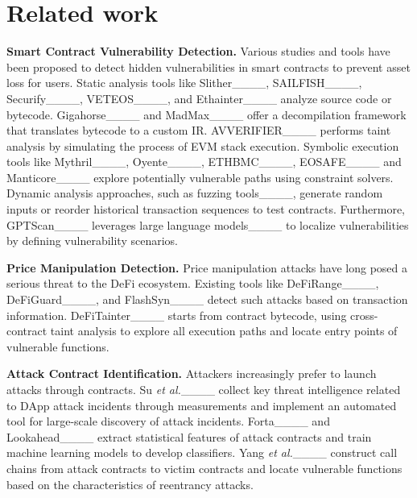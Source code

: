 \section{Related work}
\label{sec:related}


\noindent \textbf{Smart Contract Vulnerability Detection.} Various studies and tools have been proposed to detect hidden vulnerabilities in smart contracts to prevent asset loss for users. Static analysis tools like Slither____, SAILFISH____,  Securify____, VETEOS____, and Ethainter____ analyze source code or bytecode. Gigahorse____  and MadMax____ offer a decompilation framework that translates bytecode to a custom IR. AVVERIFIER____ performs taint analysis by simulating the process of EVM stack execution. Symbolic execution tools like Mythril____, Oyente____, ETHBMC____, EOSAFE____ and Manticore____ explore potentially vulnerable paths using constraint solvers. Dynamic analysis approaches, such as fuzzing tools____, generate random inputs or reorder historical transaction sequences to test contracts. Furthermore, GPTScan____ leverages large language models____ to localize vulnerabilities by defining vulnerability scenarios.


\noindent \textbf{Price Manipulation Detection.} Price manipulation attacks have long posed a serious threat to the DeFi ecosystem. Existing tools like DeFiRange____, DeFiGuard____, and FlashSyn____ detect such attacks based on transaction information. DeFiTainter____ starts from contract bytecode, using cross-contract taint analysis to explore all execution paths and locate entry points of vulnerable functions.


\noindent \textbf{Attack Contract Identification.} Attackers increasingly prefer to launch attacks through contracts. Su \textit{et al.}____ collect key threat intelligence related to DApp attack incidents through measurements and implement an automated tool for large-scale discovery of attack incidents. Forta____ and Lookahead____ extract statistical features of attack contracts and train machine learning models to develop classifiers. Yang \textit{et al.}____ construct call chains from attack contracts to victim contracts and locate vulnerable functions based on the characteristics of reentrancy attacks.